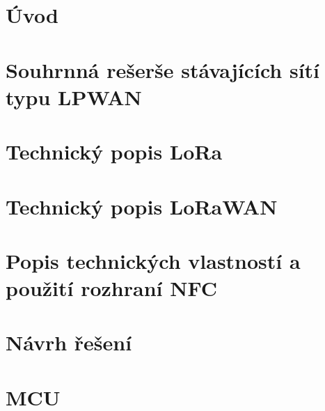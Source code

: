\documentclass[czech,bachelor]{diploma}
\begin{document}
\MakeTitlePages


\listoffigures
\clearpage

\listoftables
\clearpage

\chapter{Úvod}



\chapter{Souhrnná rešerše stávajících sítí typu LPWAN}



\chapter{Technický popis LoRa}



\chapter{Technický popis LoRaWAN}



\chapter{Popis technických vlastností a použití rozhraní NFC}



\chapter{Návrh řešení}



\chapter{MCU}
\end{document}
